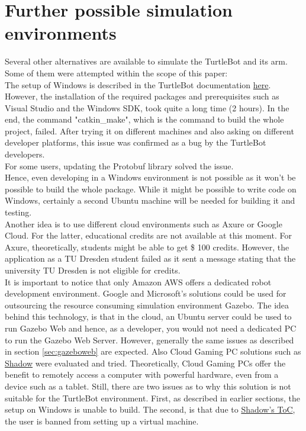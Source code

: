 \documentclass[plainarticle,zihtitle,english,final,hyperref,utf8]{zihpub}
\begin{document}
 \section{Further possible simulation environments}
 Several other alternatives are available to simulate the TurtleBot and its arm. Some of them were attempted within the scope of this paper:\\
 The setup of Windows is described in the TurtleBot documentation  \href{https://emanual.robotis.com/docs/en/platform/turtlebot3/pc_setup/\#windows-setup-remote-pc}{here}.\\
 However, the installation of the required packages and prerequisites such as Visual Studio and the Windows SDK, took quite a long time (2 hours). In the end, the command "catkin\_make", which is the command to build the whole project, failed. After trying it on different machines and also asking on different developer platforms, this issue was confirmed as a bug by the TurtleBot developers. \\
 For some users, updating the Protobuf library solved the issue. \\
 Hence, even developing in a Windows environment is not possible as it won't be possible to build the whole package. While it might be possible to write code on Windows, certainly a second Ubuntu machine will be needed for building it and testing. \\
 
 Another idea is to use different cloud environments such as Axure or Google Cloud. For the latter, educational credits are not available at this moment. For Axure, theoretically, students might be able to get \$ 100 credits. However, the application as a TU Dresden student failed as it sent a message stating that the university TU Dresden is not eligible for credits.\\
 \newline
 It is important to notice that only Amazon AWS offers a dedicated robot development environment. Google and Microsoft's solutions could be used for outsourcing the resource consuming simulation environment Gazebo. The idea behind this technology, is that in the cloud, an Ubuntu server could be used to run Gazebo Web and hence, as a developer, you would not need a dedicated PC to run the Gazebo Web Server. However, generally the same issues as described in section \ref{sec:gazeboweb} are expected.
 \newline
 Also Cloud Gaming PC solutions such as 
 \href{https://shadow.tech/dede}{Shadow} were evaluated and tried. Theoretically, Cloud Gaming PCs offer the benefit to remotely access a computer with powerful hardware, even from a device such as a tablet. Still, there are two issues as to why this solution is not suitable for the TurtleBot environment. First, as described in earlier sections, the setup on Windows is unable to build. The second, is that due to
 \href{https://help.shadow.tech/hc/en-gb/articles/360000455174-Rules-and-Restrictions-on-Shadow#h\_516367ba-b56a-4619-920d-a8223cb588f8}{Shadow's ToC}, the user is banned from setting up a virtual machine.
\newpage
\end{document}
